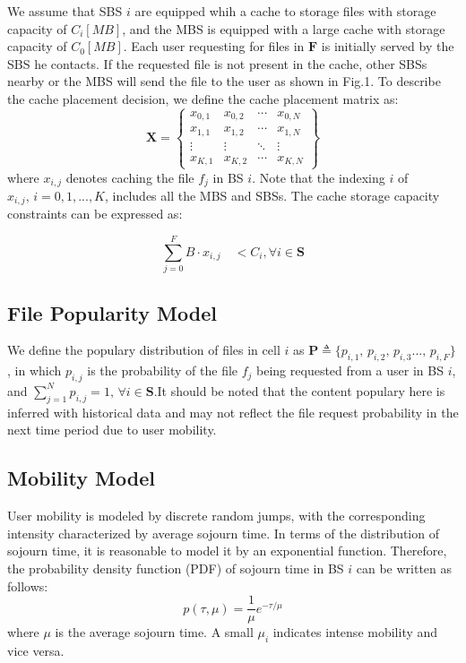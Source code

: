 \documentclass[conference]{IEEEtran}
\begin{document}
We assume that SBS $i$ are equipped whih a cache to storage files with storage capacity of $C_i[MB]$, and the MBS is equipped with a large cache with storage capacity of
$C_0[MB]$. Each user requesting for files in $\mathbf{F}$ is initially served by the SBS he contacts. If the requested file is not present in the cache, other SBSs nearby or the MBS will send the file to the user as shown in Fig.1. To describe the cache placement decision, we define the cache placement matrix as:
$$\mathbf{X}=
\begin{Bmatrix}
x_{0,1}    &x_{0,2}  & \cdots & x_{0,N} \\
x_{1,1}    &x_{1,2}  & \cdots & x_{1,N} \\
\vdots    &\vdots  & \ddots &\vdots \\
x_{K,1}    &x_{K,2}  & \cdots & x_{K,N}
\end{Bmatrix}
$$
where $x_{i,j}$ denotes caching the file $f_j$ in BS $i$. Note that the indexing $i$ of $x_{i,j}\mathrm{,\,} i=0,1,...,K$, includes all the MBS and SBSs. The cache storage capacity constraints can be expressed as:

\begin{equation}
\sum_{j=0}^F B\cdot x_{i,j}\quad<C_i, \forall{i}\in\mathbf{S}
\end{equation}

\subsection{File Popularity Model}
We define the populary distribution of files in cell $i$ as $\mathbf{P} \triangleq\{p_{i,1}\mathrm{,\,}p_{i,2}\mathrm{,\,}p_{i,3}...\mathrm{,\,}p_{i,F}\}$, in which $p_{i,j}$ is the probability of the file $f_j$ being requested from a user in BS $i$, and $ \sum_{j=1}^N p_{i,j}=1,\,\forall{i}\in\mathbf{S}$.It should be noted that the content populary here is inferred with historical data and may not reflect the file request probability in the next time period due to user mobility.

\subsection{Mobility Model}
User mobility is modeled by discrete random jumps, with the corresponding intensity characterized by average sojourn time. In terms of the distribution of sojourn time, it is reasonable to model it by an exponential function\cite{8013789}. Therefore, the probability density function (PDF) of sojourn time in BS $i$ can be written as follows:
\begin{equation}
p(\tau,\mu)=\frac{1}{\mu}e^{-\tau/\mu}
\end{equation}
where $\mu$ is the average sojourn time. A small $\mu_i$ indicates intense mobility and vice versa.
\end{document}
